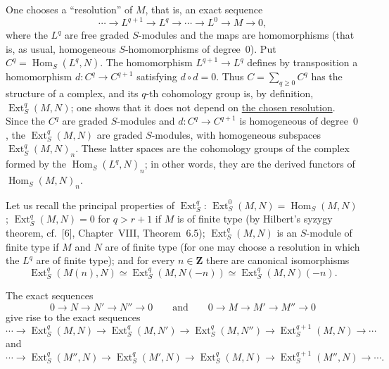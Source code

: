 \label{fac:III:4:no:68:construction:Ext}
One chooses a ``resolution'' of $M$, that is, an exact sequence
\label{fac:III:4:no:68:formula:resolution}
\[
\cdots\longrightarrow L^{q+1}\longrightarrow L^q\longrightarrow\cdots
\longrightarrow L^0\longrightarrow M\longrightarrow0,
\]
where the $L^q$ are free graded $S$-modules and the maps are
homomorphisms (that is, as usual, homogeneous $S$-homomorphisms of
degree~$0$). Put
\label{fac:III:4:no:68:def:Ext}
$C^q=\operatorname{Hom}_S(L^q,N)$. The homomorphism
$L^{q+1}\longrightarrow L^q$ defines by transposition a homomorphism
$d:C^q\longrightarrow C^{q+1}$ satisfying $d\circ d=0$. Thus
\label{fac:III:4:no:68:formula:Hom-complex}
$C=\sum_{q\geq0}C^q$ has the structure of a complex, and its $q$-th
cohomology group is, by definition, $\operatorname{Ext}_S^q(M,N)$; one
shows that it does not depend on
\hyperref[fac:III:4:no:68:formula:resolution]{the chosen resolution}. Since
the $C^q$
are graded $S$-modules and $d:C^q\longrightarrow C^{q+1}$ is homogeneous
of degree~$0$, the $\operatorname{Ext}_S^q(M,N)$ are graded $S$-modules,
with homogeneous subspaces $\operatorname{Ext}_S^q(M,N)_n$. These latter
spaces are the cohomology groups of the complex formed by the
$\operatorname{Hom}_S(L^q,N)_n$; in other words, they are the derived
functors of $\operatorname{Hom}_S(M,N)_n$.

\label{fac:III:4:no:68:properties}
Let us recall the principal properties of $\operatorname{Ext}_S^q$:
$\operatorname{Ext}_S^0(M,N)=\operatorname{Hom}_S(M,N)$;
$\operatorname{Ext}_S^q(M,N)=0$ for $q>r+1$ if $M$ is of finite type
(by Hilbert's syzygy theorem, cf.~[6], Chapter~VIII, Theorem~6.5);
$\operatorname{Ext}_S^q(M,N)$ is an $S$-module of finite type if $M$ and
$N$ are of finite type (for one may choose a resolution in which the
$L^q$ are of finite type); and for every $n\in\mathbf{Z}$ there are
canonical isomorphisms
\label{fac:III:4:no:68:formula:shift}
\[
\operatorname{Ext}_S^q(M(n),N)
 \simeq \operatorname{Ext}_S^q(M,N(-n))
 \simeq \operatorname{Ext}_S^q(M,N)(-n).
\]

The exact sequences
\label{fac:III:4:no:68:formula:short-exact}
\[
0\longrightarrow N\longrightarrow N'\longrightarrow N''\longrightarrow0
\qquad\text{and}\qquad
0\longrightarrow M\longrightarrow M'\longrightarrow M''\longrightarrow0
\]
give rise to the exact sequences
\label{fac:III:4:no:68:formula:long-exact-N}
\[
\cdots\longrightarrow\operatorname{Ext}_S^q(M,N)
\longrightarrow\operatorname{Ext}_S^q(M,N')
\longrightarrow\operatorname{Ext}_S^q(M,N'')
\longrightarrow\operatorname{Ext}_S^{q+1}(M,N)\longrightarrow\cdots
\]
and
\label{fac:III:4:no:68:formula:long-exact-M}
\[
\cdots\longrightarrow\operatorname{Ext}_S^q(M'',N)
\longrightarrow\operatorname{Ext}_S^q(M',N)
\longrightarrow\operatorname{Ext}_S^q(M,N)
\longrightarrow\operatorname{Ext}_S^{q+1}(M'',N)\longrightarrow\cdots.
\]
